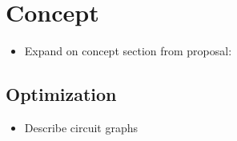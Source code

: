 \chapter{Concept}

\begin{itemize}
    \item Expand on concept section from proposal:
\end{itemize}

\section{Optimization}
\begin{itemize}
    \item Describe circuit graphs
\end{itemize}